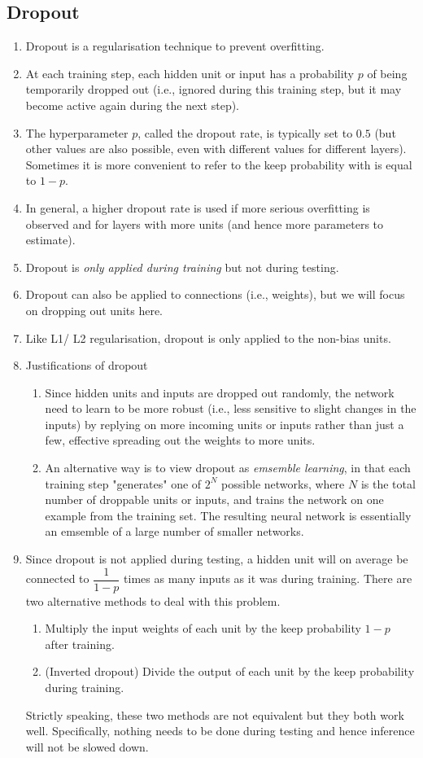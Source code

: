 \documentclass[11pt]{article}
\begin{document}
\subsection{Dropout}
\begin{enumerate}
    \item Dropout is a regularisation technique to prevent overfitting.
    \item At each training step, each hidden unit or input has a probability $p$ of being temporarily dropped out (i.e., ignored during this training step, but it may become active again during the next step). 
    \item The hyperparameter $p$, called the dropout rate, is typically set to $0.5$ (but other values are also possible, even with different values for different layers). Sometimes it is more convenient to refer to the keep probability with is equal to $1-p$. 
    \item In general, a higher dropout rate is used if more serious overfitting is observed and for layers with more units (and hence more parameters to estimate).
    \item Dropout is \emph{only applied during training} but not during testing.
    \item Dropout can also be applied to connections (i.e., weights), but we will focus on dropping out units here.
    \item Like L1/ L2 regularisation, dropout is only applied to the non-bias units.
    \item Justifications of dropout
    \begin{enumerate}
        \item Since hidden units and inputs are dropped out randomly, the network need to learn to be more robust (i.e., less sensitive to slight changes in the inputs) by replying on more incoming units or inputs rather than just a few, effective spreading out the weights to more units.
        \item An alternative way is to view dropout as \emph{emsemble learning}, in that each training step "generates" one of $2^{N}$ possible networks, where $N$ is the total number of droppable units or inputs, and trains the network on one example from the training set. The resulting neural network is essentially an emsemble of a large number of smaller networks.
    \end{enumerate}
    \item Since dropout is not applied during testing, a hidden unit will on average be connected to $\dfrac{1}{1-p}$ times as many inputs as it was during training. There are two alternative methods to deal with this problem.
    \begin{enumerate}
        \item Multiply the input weights of each unit by the keep probability $1-p$ after training.
        \item (Inverted dropout) Divide the output of each unit by the keep probability during training. 
    \end{enumerate}
    Strictly speaking, these two methods are not equivalent but they both work well. Specifically, nothing needs to be done during testing and hence inference will not be slowed down.
\end{enumerate}
\end{document}
